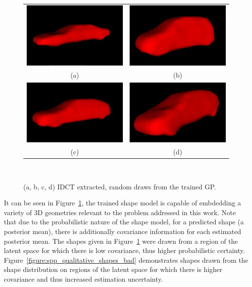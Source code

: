 \begin{figure}[!htbp]
  \centering
  \begin{tabular}{cc}
    \includegraphics[width=.4\linewidth]{figures/spp/gp_draws/0.png}&
		\includegraphics[width=.4\linewidth]{figures/spp/gp_draws/1.png}\\
    (a) & (b) \\
    \includegraphics[width=.4\linewidth]{figures/spp/gp_draws/2.png}&
		\includegraphics[width=.4\linewidth]{figures/spp/gp_draws/3.png}\\
    (c) & (d)
  \end{tabular}
  \caption[GP Shape Draws]
  {
    (a, b, c, d) IDCT extracted, random draws from the trained GP.
  }
~\label{figure:spp_qualitative_shapes}
\end{figure}

It can be seen in Figure~\ref{figure:spp_qualitative_shapes}, the trained shape model is capable of embdedding a variety of 
3D geometries relevant to the problem addressed in this work. Note that due to the probabilistic nature of the shape model, for 
a predicted shape (a posterior mean), there is additionally covariance information for each estimated posterior mean. The shapes 
given in Figure~\ref{figure:spp_qualitative_shapes} were drawn from a region of the latent space for which there is low covariance, 
thus higher probabilistic certainty. Figure~\ref{figure:spp_qualitative_shapes_bad} demonstrates shapes drawn from the shape distribution 
on regions of the latent space for which there is higher covariance and thus increased estimation uncertainty.

